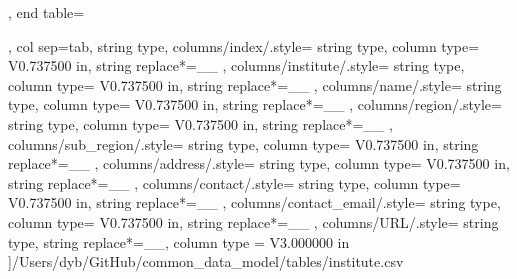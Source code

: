 \begin{landscape}
\begin{longtable}
{{            \endlastfoot
        }
    },
    end table=\end{longtable},
    col sep=tab,
    string type,
    columns/index/.style={
            string type, 
            column type= V{0.737500 in}, 
            string replace*={_}{\_}
        },
    columns/institute/.style={
            string type, 
            column type= V{0.737500 in}, 
            string replace*={_}{\_}
        },
    columns/name/.style={
            string type, 
            column type= V{0.737500 in}, 
            string replace*={_}{\_}
        },
    columns/region/.style={
            string type, 
            column type= V{0.737500 in}, 
            string replace*={_}{\_}
        },
    columns/sub_region/.style={
            string type, 
            column type= V{0.737500 in}, 
            string replace*={_}{\_}
        },
    columns/address/.style={
            string type, 
            column type= V{0.737500 in}, 
            string replace*={_}{\_}
        },
    columns/contact/.style={
            string type, 
            column type= V{0.737500 in}, 
            string replace*={_}{\_}
        },
    columns/contact_email/.style={
            string type, 
            column type= V{0.737500 in}, 
            string replace*={_}{\_}
        },
    columns/URL/.style={
            string type, 
            string replace*={_}{\_},
            column type = V{3.000000 in}
        }
    ]{/Users/dyb/GitHub/common_data_model/tables/institute.csv}
\end{landscape}
